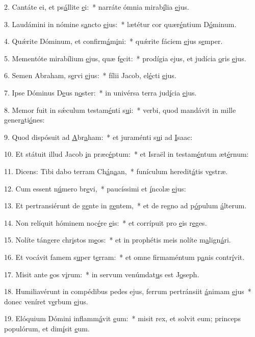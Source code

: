 2. Cantáte ei, et ps\uline{á}llite \uline{e}i:~* narráte ómnia mirab\uline{í}lia \uline{e}jus.\par 
3. Laudámini in nómine s\uline{a}ncto \uline{e}jus:~* lætétur cor quær\uline{é}ntium D\uline{ó}minum.\par 
4. Quǽrite Dóminum, et confirm\uline{á}m\uline{i}ni:~* quǽrite fáciem \uline{e}jus s\uline{e}mper.\par 
5. Mementóte mirabílium \uline{e}jus, quæ f\uline{e}cit:~* prodígia ejus, et judícia \uline{o}ris \uline{e}jus.\par 
6. Semen Abraham, s\uline{e}rvi \uline{e}jus:~* fílii Jacob, el\uline{é}cti \uline{e}jus.\par 
7. Ipse Dóminus D\uline{e}us n\uline{o}ster:~* in univérsa terra jud\uline{í}cia \uline{e}jus.\par 
8. Memor fuit in sǽculum testam\uline{é}nti s\uline{u}i:~* verbi, quod mandávit in mille gener\uline{a}ti\uline{ó}nes:\par 
9. Quod dispósuit ad \uline{A}br\uline{a}ham:~* et juraménti s\uline{u}i ad \uline{I}saac:\par 
10. Et státuit illud Jacob \uline{i}n præc\uline{é}ptum:~* et Israël in testam\uline{é}ntum æt\uline{é}rnum:\par 
11. Dicens: Tibi dabo terram Ch\uline{á}n\uline{a}an,~* funículum heredit\uline{á}tis v\uline{e}stræ.\par 
12. Cum essent n\uline{ú}mero br\uline{e}vi,~* paucíssimi et \uline{í}ncolæ \uline{e}jus:\par 
13. Et pertransiérunt de g\uline{e}nte in g\uline{e}ntem,~* et de regno ad p\uline{ó}pulum \uline{á}lterum.\par 
14. Non relíquit hóminem noc\uline{é}re \uline{e}is:~* et corrípuit pro \uline{e}is r\uline{e}ges.\par 
15. Nolíte tángere chr\uline{i}stos m\uline{e}os:~* et in prophétis meis nolíte m\uline{a}lign\uline{á}ri.\par 
16. Et vocávit famem s\uline{u}per t\uline{e}rram:~* et omne firmaméntum p\uline{a}nis contr\uline{í}vit.\par 
17. Misit ante \uline{e}os v\uline{i}rum:~* in servum venúmdat\uline{u}s est J\uline{o}seph.\par 
18. Humiliavérunt in compédibus pedes ejus, ferrum pertránsiit \uline{á}nimam \uline{e}jus~* donec veníret v\uline{e}rbum \uline{e}jus.\par 
19. Elóquium Dómini inflamm\uline{á}vit \uline{e}um:~* misit rex, et solvit eum; princeps populórum, et dim\uline{í}sit \uline{e}um.\par 
